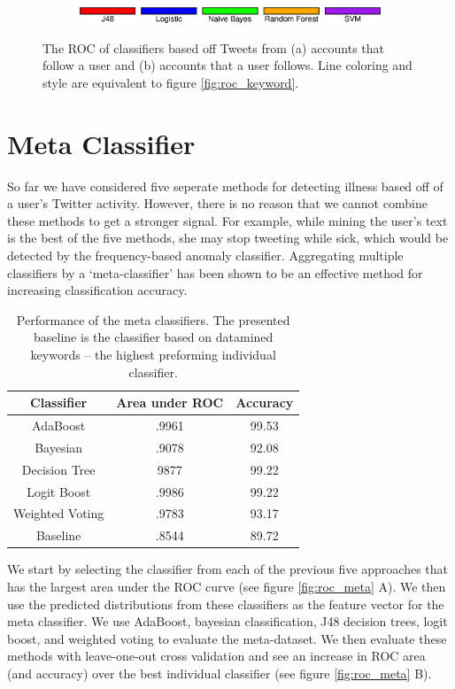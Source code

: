 \documentclass{acm_proc_article-sp}
\begin{document}
\begin{figure} [h]
\begin{subfigure}[b]{.2\textwidth}
\end{subfigure}
\begin{subfigure}[b]{.45\textwidth}
\includegraphics[width=\textwidth]{figs/keyword_legend.eps}
\end{subfigure}
\caption{The ROC of classifiers based off Tweets from (a) accounts that follow a user and (b) accounts that a user follows. Line coloring and style are equivalent to figure \ref{fig:roc_keyword}.}
\label{fig:roc_network}
\end{figure}

\section{Meta Classifier}

So far we have considered five seperate methods for detecting illness based off of a user's Twitter activity. However, there is no reason that we cannot combine these methods to get a stronger signal. For example, while mining the user's text is the best of the five methods, she may stop tweeting while sick, which would be detected by the frequency-based anomaly classifier. Aggregating multiple classifiers by a `meta-classifier' has been shown to be an effective method for increasing classification accuracy. \cite{Frossyniotis:2004wx,Todorovski:2003hk}

\begin{table}
\centering
\begin{tabular}{|c|c|c|} \hline
Classifier&Area under ROC& Accuracy \\ \hline
AdaBoost & .9961 & 99.53\\ \hline
Bayesian & .9078 &  92.08\\ \hline
Decision Tree & 9877 & 99.22\\ \hline
Logit Boost & .9986 & 99.22\\ \hline
Weighted Voting & .9783 & 93.17\\ \hline
Baseline & .8544 & 89.72\\ 
\hline\end{tabular}
\caption{Performance of the meta classifiers. The presented baseline is the classifier based on datamined keywords -- the highest preforming individual classifier.}
\label{tab:meta_results}
\end{table}

We start by selecting the classifier from each of the previous five approaches that has the largest area under the ROC curve (see figure \ref{fig:roc_meta} A). We then use the predicted distributions from these classifiers as the feature vector for the meta classifier. We use AdaBoost, bayesian classification, J48 decision trees, logit boost, and weighted voting to evaluate the meta-dataset. We then evaluate these methods with leave-one-out cross validation and see an increase in ROC area (and accuracy) over the best individual classifier (see figure \ref{fig:roc_meta} B).
\end{document}
